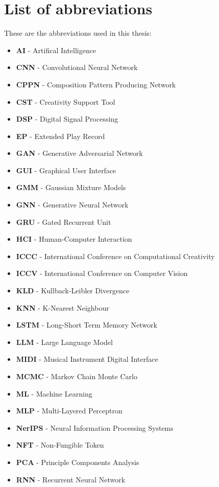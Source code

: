 \chapter*{List of abbreviations}

These are the abbreviations used in this thesis: 
\begin{itemize}
\item \textbf{AI} - Artifical Intelligence
\item \textbf{CNN} - Convolutional Neural Network
\item \textbf{CPPN} - Composition Pattern Producing Network
\item \textbf{CST} - Creativity Support Tool
\item \textbf{DSP} - Digital Signal Processing
\item \textbf{EP} - Extended Play Record
\item \textbf{GAN} - Generative Adversarial Network
\item \textbf{GUI} - Graphical User Interface
\item \textbf{GMM} - Gaussian Mixture Models
\item \textbf{GNN} - Generative Neural Network
\item \textbf{GRU} - Gated Recurrent Unit
\item \textbf{HCI} - Human-Computer Interaction
\item \textbf{ICCC} - International Conference on Computational Creativity
\item \textbf{ICCV} - International Conference on Computer Vision
\item \textbf{KLD} - Kullback-Leibler Divergence
\item \textbf{KNN} - K-Nearest Neighbour
\item \textbf{LSTM} - Long-Short Term Memory Network
\item \textbf{LLM} - Large Language Model
\item \textbf{MIDI} - Musical Instrument Digital Interface
\item \textbf{MCMC} - Markov Chain Monte Carlo
\item \textbf{ML} - Machine Learning
\item \textbf{MLP} - Multi-Layered Perceptron
\item \textbf{NerIPS} - Neural Information Processing Systems
\item \textbf{NFT} - Non-Fungible Token
\item \textbf{PCA} - Principle Components Analysis
\item \textbf{RNN} - Recurrent Neural Network

\end{itemize}
